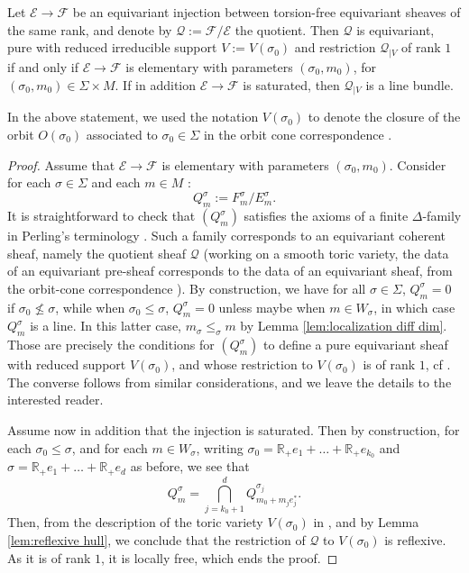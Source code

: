 \documentclass[a4paper,10pt]{amsart}
\theoremstyle{plain}{
    \newtheorem{theorem}{Theorem}[section]
    \newtheorem{lemma}[theorem]{Lemma}
    \newtheorem{corollary}[theorem]{Corollary}
    \newtheorem{proposition}[theorem]{Proposition}
    \newtheorem{conjecture}[theorem]{Conjecture}
}
\theoremstyle{definition}{
    \newtheorem{definition}[theorem]{Definition}
    \newtheorem{defn-thm}[theorem]{Definition-Theorem}
    \newtheorem{example}[theorem]{Example}
    \newtheorem{notation}[theorem]{Notation}
}
\theoremstyle{remark}{
    \newtheorem{remark}[theorem]{Remark}
    \newtheorem{problem}[theorem]{Problem}
    \newtheorem{question}[theorem]{Question}
}
\def\cF{\mathcal{F}}
\def\cE{\mathcal{E}}
\def\cQ{\mathcal{Q}}
\def\R{\mathbb{R}}
\begin{document}
\begin{proposition}
 \label{prop:elementary injection geometric}
  Let $\cE\to\cF$ be an equivariant injection between torsion-free equivariant sheaves of the same rank, and denote by $\cQ:=\cF/\cE$ the quotient. Then $\cQ$ is equivariant, pure with reduced irreducible support $V:=V(\sigma_0)$ and  restriction $\cQ_{\vert V}$ of rank $1$ if and only if $\cE\to\cF$ is elementary with parameters $(\sigma_0,m_0)$, for $(\sigma_0,m_0)\in\Sigma\times M$. If in addition $\cE\to\cF$ is saturated, then $\cQ_{\vert V}$ is a line bundle.
\end{proposition}
In the above statement, we used the notation $V(\sigma_0)$ to denote the closure of the orbit $O(\sigma_0)$ associated to $\sigma_0\in\Sigma$ in the orbit cone correspondence \cite[Section 3.2]{CLS}. 
\begin{proof}
Assume that $\cE\to\cF$ is elementary with parameters $(\sigma_0,m_0)$.
 Consider for each $\sigma\in\Sigma$ and each $m\in M$ : 
 $$
 Q^\sigma_m:=F^\sigma_m/E^\sigma_m.
 $$
 It is straightforward to check that $(Q^\sigma_m)$ satisfies the axioms of a finite $\Delta$-family in Perling's terminology \cite[Section 5]{Per04}. Such a family corresponds to an equivariant coherent sheaf, namely the quotient sheaf $\cQ$ (working on a smooth toric variety, the data of an equivariant pre-sheaf corresponds to the data of an equivariant sheaf, from the orbit-cone correspondence \cite[Section 3.2]{CLS}). By construction, we have for all $\sigma\in\Sigma$, $Q^\sigma_m=0$ if $\sigma_0\nleq \sigma$, while when $\sigma_0\leq\sigma$, $Q^\sigma_m=0$ unless maybe when $m\in W_\sigma$, in which case $Q^\sigma_m$ is a line. In this latter case, $m_\sigma\leq_\sigma m$ by Lemma \ref{lem:localization diff dim}. Those are precisely the conditions for $(Q^\sigma_m)$ to define a pure equivariant sheaf with reduced support $V(\sigma_0)$, and whose restriction to $V(\sigma_0)$ is of rank $1$, cf \cite[Proposition 2.8 and Theorem 2.10]{Koo11}.
 The converse follows from similar considerations, and we leave the details to the interested reader. 
 
 Assume now in addition that the injection is saturated. Then by construction, for each $\sigma_0\leq\sigma$, and for each $m\in W_\sigma$, writing $\sigma_0=\R_+e_1+\ldots+\R_+e_{k_0}$ and $\sigma=\R_+e_1+\ldots+\R_+e_d$ as before, we see that 
 $$
 Q^\sigma_m=\bigcap_{j=k_0+1}^d Q^{\sigma_j}_{m_0+m_je_j^*}.
 $$
 Then, from the description of the toric variety $V(\sigma_0)$ in \cite[Section 3.2]{CLS}, and by Lemma \ref{lem:reflexive hull}, we conclude that the restriction of $\cQ$ to $V(\sigma_0)$ is reflexive. As it is of rank $1$, it is locally free, which ends the proof.
 
\end{proof}
\end{document}
